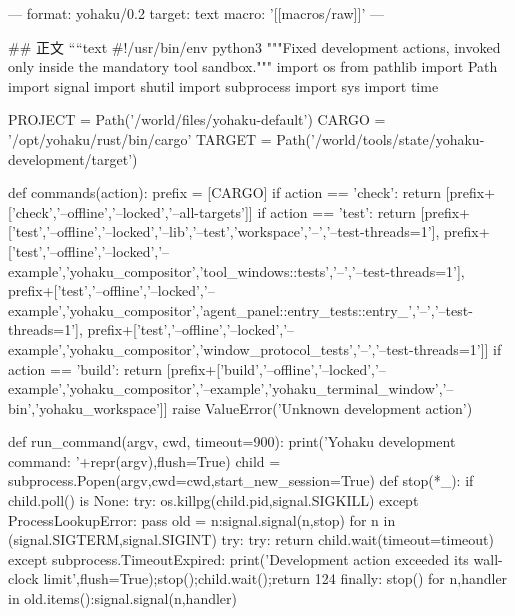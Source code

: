 ---
format: yohaku/0.2
target: text
macro: '[[macros/raw]]'
---

## 正文
````text
#!/usr/bin/env python3
"""Fixed development actions, invoked only inside the mandatory tool sandbox."""
import os
from pathlib import Path
import signal
import shutil
import subprocess
import sys
import time

PROJECT = Path('/world/files/yohaku-default')
CARGO = '/opt/yohaku/rust/bin/cargo'
TARGET = Path('/world/tools/state/yohaku-development/target')


def commands(action):
    prefix = [CARGO]
    if action == 'check': return [prefix+['check','--offline','--locked','--all-targets']]
    if action == 'test':
        return [prefix+['test','--offline','--locked','--lib','--test','workspace','--','--test-threads=1'],
                prefix+['test','--offline','--locked','--example','yohaku_compositor','tool_windows::tests','--','--test-threads=1'],
                prefix+['test','--offline','--locked','--example','yohaku_compositor','agent_panel::entry_tests::entry_','--','--test-threads=1'],
                prefix+['test','--offline','--locked','--example','yohaku_compositor','window_protocol_tests','--','--test-threads=1']]
    if action == 'build': return [prefix+['build','--offline','--locked','--example','yohaku_compositor','--example','yohaku_terminal_window','--bin','yohaku_workspace']]
    raise ValueError('Unknown development action')


def run_command(argv, cwd, timeout=900):
    print('Yohaku development command: '+repr(argv),flush=True)
    child = subprocess.Popen(argv,cwd=cwd,start_new_session=True)
    def stop(*_):
        if child.poll() is None:
            try: os.killpg(child.pid,signal.SIGKILL)
            except ProcessLookupError: pass
    old = {n:signal.signal(n,stop) for n in (signal.SIGTERM,signal.SIGINT)}
    try:
        try: return child.wait(timeout=timeout)
        except subprocess.TimeoutExpired:
            print('Development action exceeded its wall-clock limit',flush=True);stop();child.wait();return 124
    finally:
        stop()
        for n,handler in old.items():signal.signal(n,handler)


